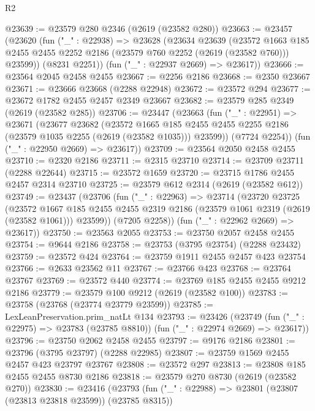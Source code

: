 \begin{lexlean}{R2}
\begin{coremodule}
@23639 := @23579 @280 @2346 (@2619 (@23582 @280))
@23663 := @23457
    (@23620
      (fun ("_" : @22938) =>
      @23628
        (@23634
          @23639
          (@23572
            @1663
            @185
            @2455
            @2455
            @2252
            @2186
            (@23579 @760 @2252 (@2619 (@23582 @760)))
            @23599))
        (@8231 @2251))
      (fun ("_" : @22937 @2669) => @23617))
@23666 := @23564 @2045 @2458 @2455
@23667 := @2256 @2186
@23668 := @2350 @23667
@23671 := @23666 @23668 (@2288 @22948)
@23672 := @23572 @294
@23677 := @23672 @1782 @2455 @2457 @2349 @23667
@23682 := @23579 @285 @2349 (@2619 (@23582 @285))
@23706 := @23447
    (@23663
      (fun ("_" : @22951) =>
      @23671
        (@23677
          @23682
          (@23572
            @1665
            @185
            @2455
            @2455
            @2255
            @2186
            (@23579 @1035 @2255 (@2619 (@23582 @1035)))
            @23599))
        (@7724 @2254))
      (fun ("_" : @22950 @2669) => @23617))
@23709 := @23564 @2050 @2458 @2455
@23710 := @2320 @2186
@23711 := @2315 @23710
@23714 := @23709 @23711 (@2288 @22644)
@23715 := @23572 @1659
@23720 := @23715 @1786 @2455 @2457 @2314 @23710
@23725 := @23579 @612 @2314 (@2619 (@23582 @612))
@23749 := @23437
    (@23706
      (fun ("_" : @22963) =>
      @23714
        (@23720
          @23725
          (@23572
            @1667
            @185
            @2455
            @2455
            @2319
            @2186
            (@23579 @1061 @2319 (@2619 (@23582 @1061)))
            @23599))
        (@7205 @2258))
      (fun ("_" : @22962 @2669) => @23617))
@23750 := @23563 @2055
@23753 := @23750 @2057 @2458 @2455
@23754 := @9644 @2186
@23758 := @23753 (@3795 @23754) (@2288 @23432)
@23759 := @23572 @424
@23764 := @23759 @1911 @2455 @2457 @423 @23754
@23766 := @2633 @23562 @11
@23767 := @23766 @423
@23768 := @23764 @23767
@23769 := @23572 @440
@23774 := @23769 @185 @2455 @2455 @9212 @2186
@23779 := @23579 @100 @9212 (@2619 (@23582 @100))
@23783 := @23758 (@23768 (@23774 @23779 @23599))
@23785 := LexLeanPreservation.prim_natLt @134
@23793 := @23426
    (@23749 (fun ("_" : @22975) => @23783 (@23785 @8810)) (fun ("_" : @22974 @2669) => @23617))
@23796 := @23750 @2062 @2458 @2455
@23797 := @9176 @2186
@23801 := @23796 (@3795 @23797) (@2288 @22985)
@23807 := @23759 @1569 @2455 @2457 @423 @23797 @23767
@23808 := @23572 @297
@23813 := @23808 @185 @2455 @2455 @8730 @2186
@23818 := @23579 @270 @8730 (@2619 (@23582 @270))
@23830 := @23416
    (@23793
      (fun ("_" : @22988) => @23801 (@23807 (@23813 @23818 @23599)) (@23785 @8315))

\end{coremodule}
\end{lexlean}
